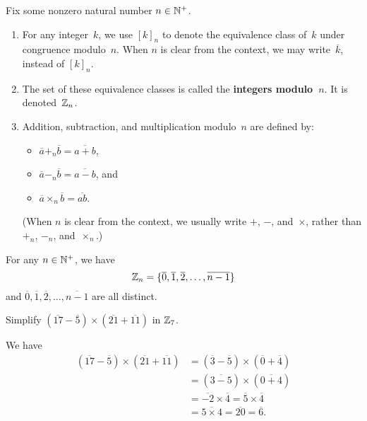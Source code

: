 \documentclass[../MATH-2000-Notes.tex]{subfiles}
\begin{document}
\begin{Definition}
    {}
    Fix some nonzero natural number $n \in \mathbb{N}^+$.
    \begin{enumerate}
        \item For any integer~$k$, we use $[k]_n$ to denote the equivalence class of~$k$ under congruence modulo~$n$. When $n$ is clear from the context, we may write~$\overline{k}$, instead of $[k]_n$.
        \item The set of these equivalence classes is called the \textbf{integers modulo~$n$}. It is denoted~$\mathbb{Z}_n$.
        \item Addition, subtraction, and multiplication modulo~$n$ are defined by:
              \begin{itemize}
                  \item $\overline{a} \mathbin{+_n} \overline{b} = \overline{a + b}$,
                  \item $\overline{a} \mathbin{-_n} \overline{b} = \overline{a - b}$,
                        and
                  \item $\overline{a} \mathbin{\times_n} \overline{b} = \overline{a  b}$.
              \end{itemize}
              (When $n$ is clear from the context, we usually write $+$, $-$, and~$\times$, rather than $+_n$, $-_n$, and~$\times_n$.)
    \end{enumerate}
\end{Definition}
\begin{Proposition}
    {}
    For any $n \in \mathbb{N}^+$, we have 
	$$\mathbb{Z}_n = \{ \overline{0}, \overline{1}, \overline{2}, \ldots, \overline{n-1} \}$$
and\/ $\overline{0}, \overline{1}, \overline{2}, \ldots, \overline{n-1}$ are all distinct.
\end{Proposition}

\begin{Questions}
    \item Simplify $(\overline{17} - \overline{5}) \times (\overline{21} +\overline{11})$ in $\mathbb{Z}_7$.
\end{Questions}
\begin{Answers}
    \item We have
	\begin{align*}
	(\overline{17} - \overline{5}) \times (\overline{21} +\overline{11})
	&=(\overline{3} - \overline{5}) \times (\overline{0} +\overline{4})
	\\&=  (\overline{3 - 5}) \times (\overline{0 + 4})
	\\&= \overline{-2} \times \overline{4}
	= \overline{5} \times \overline{4}
	\\&= \overline{5 \times 4}
	= \overline{20}
	= \overline{6}
	. \end{align*}
\end{Answers}
\end{document}
